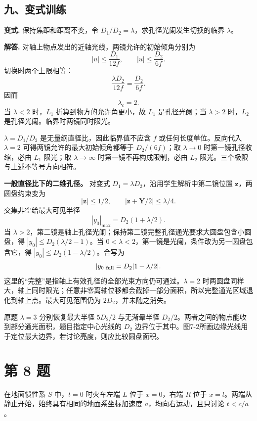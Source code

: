 \documentclass[12pt,a4paper,UTF8]{ctexart}
\begin{document}
\subsection{九、变式训练}\label{ux4e5dux53d8ux5f0fux8badux7ec3-6}

\textbf{变式.} 保持焦距和距离不变，令
\(D_1/D_2=\lambda\)，求孔径光阑发生切换的临界 \(\lambda\)。

\textbf{解答.} 对轴上物点发出的近轴光线，两镜允许的初始倾角分别为 \[
|u|\le\frac{D_1}{12f},
\qquad
|u|\le\frac{D_2}{6f}.
\] 切换时两个上限相等： \[
\frac{\lambda D_2}{12f}=\frac{D_2}{6f}.
\] 因而 \[
\boxed{\lambda_c=2}.
\] 当 \(\lambda<2\) 时，\(L_1\) 折算到物方的允许角更小，故 \(L_1\)
是孔径光阑；当 \(\lambda>2\) 时，\(L_2\)
是孔径光阑。临界时两镜同时限光。

\(\lambda=D_1/D_2\) 是无量纲直径比，因此临界值不应含 \(f\)
或任何长度单位。反向代入 \(\lambda=2\) 可得两镜允许的最大初始倾角都等于
\(D_2/(6f)\)；取 \(\lambda\to0\) 时第一镜孔径收缩，必由 \(L_1\) 限光；取
\(\lambda\to\infty\) 时第一镜不再构成限制，必由 \(L_2\)
限光。三个极限与上述不等号方向相符。

\textbf{一般直径比下的二维孔径。} 对变式
\(D_1=\lambda D_2\)，沿用学生解析中第二镜位置 \(\bm z\)，两圆盘约束变为
\[
|\bm z|\le1/2,\qquad
|\bm z+\bm Y/2|\le\lambda/4.
\] 交集非空给最大可见半径 \[
|y_0|_{\max}=D_2(1+\lambda/2).
\] 当
\(\lambda>2\)，第二镜是轴上孔径光阑；保持第二镜完整孔径通光要求大圆盘包含小圆盘，得
\(|y_0|\le D_2(\lambda/2-1)\)。当
\(0<\lambda<2\)，第一镜是光阑，条件改为另一圆盘包含它，得
\(|y_0|\le D_2(1-\lambda/2)\)。合写为 \[
|y_0|_{\rm full}=D_2|1-\lambda/2|.
\] 这里的``完整''是指轴上有效孔径的全部光束方向仍可通过。\(\lambda=2\)
时两圆盘同样大，轴上同时限光；任意非零离轴位移都会截掉一部分面积，所以完整通光区域退化到轴上点。最大可见范围仍为
\(2D_2\)，并未随之消失。

原题 \(\lambda=3\) 分别恢复最大半径 \(5D_2/2\) 与无渐晕半径
\(D_2/2\)。两者之间的物点能收到部分通光面积，题目指定中心光线的 \(D_2\)
边界位于其中。图7-2所画边缘光线用于定位最大边界，若讨论亮度，则应比较圆盘面积。

\newpage

\section{第 8 题}\label{ux7b2c-8-ux9898}

在地面惯性系 \(S\) 中，\(t=0\) 时火车左端 \(L\) 位于 \(x=0\)，右端 \(R\)
位于 \(x=l\)。两端从静止开始，始终具有相同的地面系坐标加速度
\(a\)，均向右运动，且只讨论 \(t<c/a\)。
\end{document}
